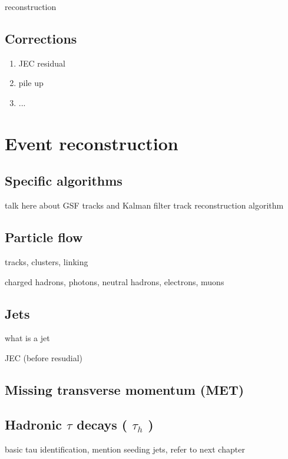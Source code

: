 reconstruction

\subsection{Corrections}

\begin{enumerate}
\item JEC residual
\item pile up
\item ...
\end{enumerate}

\section{Event reconstruction}
\label{sec:cms_physics_event_reconstruction}

\subsection{Specific algorithms}

talk here about GSF tracks and Kalman filter track reconstruction algorithm

\subsection{Particle flow}
\label{sec:pf}
tracks, clusters, linking

charged hadrons, photons, neutral hadrons, electrons, muons

\subsection{Jets}

\label{sec:jet_clustering}

what is a jet

JEC (before resudial)

\subsection{Missing transverse momentum (MET)}

\subsection{Hadronic $\tau$ decays ( $\tau_{h}$ )}

basic tau identification, mention seeding jets, refer to next chapter

